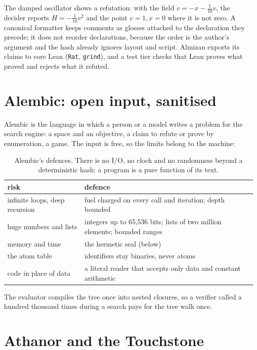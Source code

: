 The damped oscillator shows a refutation: with the field $\dot v = -x - \tfrac{1}{10}v$, the decider
reports $\dot H = -\tfrac{1}{10}v^2$ and the point $v = 1, x = 0$ where it is not zero. A canonical
formatter keeps comments as glosses attached to the declaration they precede; it does not reorder
declarations, because the order is the author's argument and the hash already ignores layout and
script. Almizan exports its claims to core Lean (\texttt{Rat}, \texttt{grind}), and a test tier checks
that Lean proves what \vapor{} proved and rejects what it refuted.

\section{Alembic: open input, sanitised}

Alembic is the language in which a person or a model writes a problem for the search engine: a space and
an objective, a claim to refute or prove by enumeration, a game. The input is free, so the limits belong
to the machine:

\begin{table}[h]
\centering\small
\begin{tabularx}{\textwidth}{@{}lX@{}}
\toprule
risk & defence \\
\midrule
infinite loops, deep recursion & fuel charged on every call and iteration; depth bounded \\
huge numbers and lists & integers up to 65{,}536 bits; lists of two million elements; bounded ranges \\
memory and time & the hermetic seal (below) \\
the atom table & identifiers stay binaries, never atoms \\
code in place of data & a literal reader that accepts only data and constant arithmetic \\
\bottomrule
\end{tabularx}
\caption{Alembic's defences. There is no I/O, no clock and no randomness beyond a deterministic hash:
a program is a pure function of its text.}
\end{table}

The evaluator compiles the tree once into nested closures, so a verifier called a hundred thousand times
during a search pays for the tree walk once.

\section{Athanor and the Touchstone}

